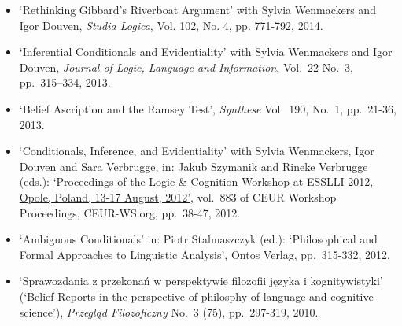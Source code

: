 \documentclass[11pt,article,oneside]{memoir}
\begin{document}
\begin{itemize}

  \end{itemize}


  \begin{itemize}
    \item `Rethinking Gibbard's Riverboat Argument' with Sylvia Wenmackers and Igor Douven, \emph{Studia Logica}, Vol. 102, No. 4, pp. 771-792, 2014.

    \item `Inferential Conditionals and Evidentiality' with Sylvia Wenmackers and Igor Douven, \emph{Journal of Logic, Language and Information}, Vol.~22 No.~3, pp.~315–334, 2013.

    \item `Belief Ascription and the Ramsey Test', \emph{Synthese} Vol.~190, No.~1, pp.~21-36, 2013. %

    \item `Conditionals, Inference, and Evidentiality' with Sylvia Wenmackers, Igor Douven and Sara Verbrugge, in: Jakub Szymanik and Rineke Verbrugge (eds.): \href{http://ceur-ws.org/Vol-883/}{`Proceedings of the Logic \& Cognition Workshop at ESSLLI 2012, Opole, Poland, 13-17 August, 2012'}, vol.~883 of CEUR Workshop Proceedings, CEUR-WS.org, pp.~38-47, 2012.

    \item `Ambiguous Conditionals' in: Piotr Stalmaszczyk (ed.): `Philosophical and Formal Approaches to Linguistic Analysis', Ontos Verlag, pp.~315-332, 2012.

    \item `Sprawozdania z przekonań w perspektywie filozofii języka i kognitywistyki' (`Belief Reports in the perspective of philosphy of language and cognitive science'), \emph{Przegląd Filozoficzny} No.~3 (75), pp.~297-319, 2010.

  \end{itemize}
\end{document}
